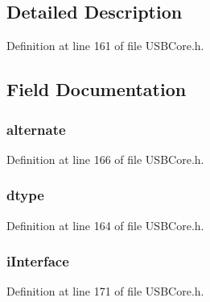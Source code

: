 \subsection{Detailed Description}


Definition at line 161 of file U\+S\+B\+Core.\+h.



\subsection{Field Documentation}
\hypertarget{struct_interface_descriptor_a8b2cf5542b22d4c9ae79dfe6f7cd6d11}{}
\subsubsection[{alternate}]{ alternate}\label{struct_interface_descriptor_a8b2cf5542b22d4c9ae79dfe6f7cd6d11}


Definition at line 166 of file U\+S\+B\+Core.\+h.

\hypertarget{struct_interface_descriptor_a0bb419531ec75697e63e9109fecf81b0}{}
\subsubsection[{dtype}]{ dtype}\label{struct_interface_descriptor_a0bb419531ec75697e63e9109fecf81b0}


Definition at line 164 of file U\+S\+B\+Core.\+h.

\hypertarget{struct_interface_descriptor_a08ba0e1160648c2e45d24d1f00484466}{}
\subsubsection[{i\+Interface}]{ i\+Interface}\label{struct_interface_descriptor_a08ba0e1160648c2e45d24d1f00484466}


Definition at line 171 of file U\+S\+B\+Core.\+h.

\hypertarget{struct_interface_descriptor_ac54ccb285d7fbe7c6516d4ca1a46d51c}{}

